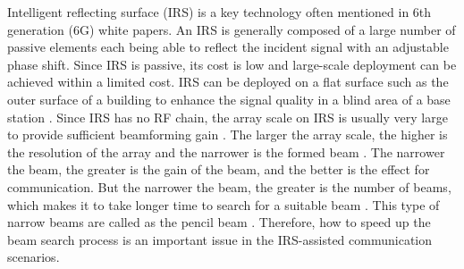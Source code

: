\documentclass[12pt,draftclsnofoot,onecolumn]{IEEEtran}
\begin{document}
%	
%	
%	

Intelligent reflecting surface (IRS) is a key technology often mentioned in 6th generation (6G) white papers. An IRS is generally composed of a large number of passive elements each being able to reflect the incident signal with an adjustable phase shift. Since IRS is passive, its cost is low and large-scale deployment can be achieved within a limited cost. IRS can be deployed on a flat surface such as the outer surface of a building to enhance the signal quality in a blind area of a base station  \cite{DBLP:journals/tcom/WuZZYZ21}. Since IRS has no RF chain, the array scale on IRS is usually very large to provide sufficient beamforming gain \cite{DBLP:journals/tcom/WuZZYZ21}. The larger the array scale, the higher is the resolution of the array and the narrower is the formed beam \cite{DBLP:journals/icl/JamaliNSP21}. The narrower the beam, the greater is the gain of the beam, and the better is the effect for communication. But the narrower the beam, the greater is the number of beams, which makes it to take longer time to search for a suitable beam \cite{DBLP:journals/icl/JamaliNSP21}. This type of narrow beams are called as the  pencil beam \cite{DBLP:conf/sigcomm/HassaniehARAKI18}. Therefore, how to speed up the beam search process is an important issue in the IRS-assisted communication scenarios.
\end{document}
